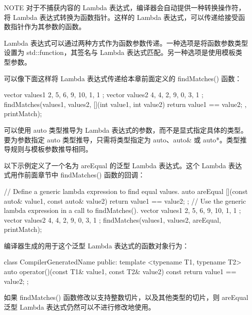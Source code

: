 \begin{myNotic}{NOTE}
对于不捕获内容的 Lambda 表达式，编译器会自动提供一种转换操作符，将 Lambda 表达式转换为函数指针。这样的 Lambda 表达式，可以传递给接受函数指针作为其参数的函数。
\end{myNotic}


Lambda 表达式可以通过两种方式作为函数参数传递。一种选项是将函数参数类型设置为 std::function，其签名与 Lambda 表达式匹配。另一种选项是使用模板类型参数。

可以像下面这样将 Lambda 表达式传递给本章前面定义的 findMatches() 函数：

\begin{cpp}
vector values1 { 2, 5, 6, 9, 10, 1, 1 };
vector values2 { 4, 4, 2, 9, 0, 3, 1 };
findMatches(values1, values2,
    [](int value1, int value2) { return value1 == value2; },
    printMatch);
\end{cpp}


可以使用 auto 类型推导为 Lambda 表达式的参数，而不是显式指定具体的类型。要为参数指定 auto 类型推导，只需将类型指定为 auto、auto\& 或 auto*。类型推导规则与模板参数推导相同。

以下示例定义了一个名为 areEqual 的泛型 Lambda 表达式。这个 Lambda 表达式用作前面章节中 findMatches() 函数的回调：

\begin{cpp}
// Define a generic lambda expression to find equal values.
auto areEqual { [](const auto& value1, const auto& value2) {
        return value1 == value2; } };
// Use the generic lambda expression in a call to findMatches().
vector values1 { 2, 5, 6, 9, 10, 1, 1 };
vector values2 { 4, 4, 2, 9, 0, 3, 1 };
findMatches(values1, values2, areEqual, printMatch);
\end{cpp}

编译器生成的用于这个泛型 Lambda 表达式的函数对象行为：

\begin{cpp}
class CompilerGeneratedName
{
    public:
        template <typename T1, typename T2>
        auto operator()(const T1& value1, const T2& value2) const {
            return value1 == value2; }
};
\end{cpp}

如果 findMatches() 函数修改以支持整数切片，以及其他类型的切片，则 areEqual 泛型 Lambda 表达式仍然可以不进行修改地使用。


